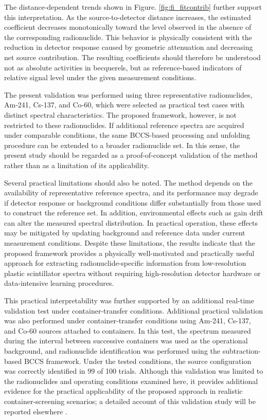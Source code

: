 \documentclass[10pt]{wlscirep}
\begin{document}
The distance-dependent trends shown in Figure. \ref{fig:fi_fitcontrib} further support this interpretation. As the source-to-detector distance increases, the estimated coefficient decreases monotonically toward the level observed in the absence of the corresponding radionuclide. This behavior is physically consistent with the reduction in detector response caused by geometric attenuation and decreasing net source contribution. The resulting coefficients should therefore be understood not as absolute activities in becquerels, but as reference-based indicators of relative signal level under the given measurement conditions.

The present validation was performed using three representative radionuclides, Am-241, Cs-137, and Co-60, which were selected as practical test cases with distinct spectral characteristics. The proposed framework, however, is not restricted to these radionuclides. If additional reference spectra are acquired under comparable conditions, the same BCCS-based processing and unfolding procedure can be extended to a broader radionuclide set. In this sense, the present study should be regarded as a proof-of-concept validation of the method rather than as a limitation of its applicability.

Several practical limitations should also be noted. The method depends on the availability of representative reference spectra, and its performance may degrade if detector response or background conditions differ substantially from those used to construct the reference set. In addition, environmental effects such as gain drift can alter the measured spectral distribution. In practical operation, these effects may be mitigated by updating background and reference data under current measurement conditions. Despite these limitations, the results indicate that the proposed framework provides a physically well-motivated and practically useful approach for extracting radionuclide-specific information from low-resolution plastic scintillator spectra without requiring high-resolution detector hardware or data-intensive learning procedures.

This practical interpretability was further supported by an additional real-time validation test under container-transfer conditions. Additional practical validation was also performed under container-transfer conditions using Am-241, Cs-137, and Co-60 sources attached to containers. In this test, the spectrum measured during the interval between successive containers was used as the operational background, and radionuclide identification was performed using the subtraction-based BCCS framework. Under the tested conditions, the source configuration was correctly identified in 99 of 100 trials. Although this validation was limited to the radionuclides and operating conditions examined here, it provides additional evidence for the practical applicability of the proposed approach in realistic container-screening scenarios; a detailed account of this validation study will be reported elsewhere \cite{Unpublished1}.
\end{document}
